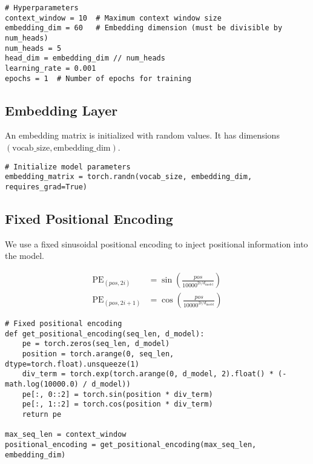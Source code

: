\documentclass{article}
\begin{document}
\begin{lstlisting}[style=pythonstyle]
# Hyperparameters
context_window = 10  # Maximum context window size
embedding_dim = 60   # Embedding dimension (must be divisible by num_heads)
num_heads = 5
head_dim = embedding_dim // num_heads
learning_rate = 0.001
epochs = 1  # Number of epochs for training
\end{lstlisting}

\subsection{Embedding Layer}

An embedding matrix is initialized with random values. It has dimensions \((\text{vocab\_size}, \text{embedding\_dim})\).

\begin{lstlisting}[style=pythonstyle]
# Initialize model parameters
embedding_matrix = torch.randn(vocab_size, embedding_dim, requires_grad=True)
\end{lstlisting}

\subsection{Fixed Positional Encoding}

We use a fixed sinusoidal positional encoding to inject positional information into the model.

\begin{equation}
\begin{aligned}
    \text{PE}_{(pos, 2i)} &= \sin\left(\frac{pos}{10000^{2i / d_{\text{model}}}}\right) \\
    \text{PE}_{(pos, 2i+1)} &= \cos\left(\frac{pos}{10000^{2i / d_{\text{model}}}}\right)
\end{aligned}
\end{equation}

\begin{lstlisting}[style=pythonstyle]
# Fixed positional encoding
def get_positional_encoding(seq_len, d_model):
    pe = torch.zeros(seq_len, d_model)
    position = torch.arange(0, seq_len, dtype=torch.float).unsqueeze(1)
    div_term = torch.exp(torch.arange(0, d_model, 2).float() * (-math.log(10000.0) / d_model))
    pe[:, 0::2] = torch.sin(position * div_term)
    pe[:, 1::2] = torch.cos(position * div_term)
    return pe

max_seq_len = context_window
positional_encoding = get_positional_encoding(max_seq_len, embedding_dim)
\end{lstlisting}
\end{document}
